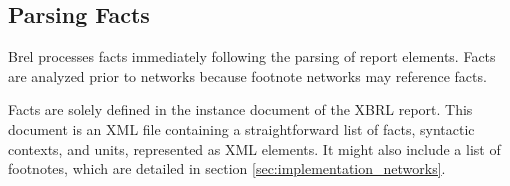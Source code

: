 \subsection{Parsing Facts}








Brel processes facts immediately following the parsing of report elements.
Facts are analyzed prior to networks because footnote networks may reference facts.

Facts are solely defined in the instance document of the XBRL report.
This document is an XML file containing a straightforward list of facts, syntactic contexts, and units, represented as XML elements.
It might also include a list of footnotes, which are detailed in section \ref{sec:implementation_networks}.

